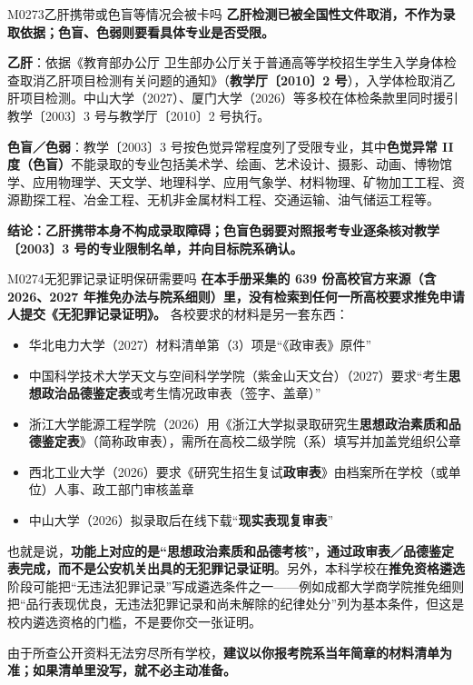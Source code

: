 \begin{qa}{M0273}{乙肝携带或色盲等情况会被卡吗}
\textbf{乙肝检测已被全国性文件取消，不作为录取依据；色盲、色弱则要看具体专业是否受限。}

\textbf{乙肝}：依据《教育部办公厅 卫生部办公厅关于普通高等学校招生学生入学身体检查取消乙肝项目检测有关问题的通知》（\textbf{教学厅〔2010〕2 号}），入学体检取消乙肝项目检测。中山大学（2027）、厦门大学（2026）等多校在体检条款里同时援引教学〔2003〕3 号与教学厅〔2010〕2 号执行。

\textbf{色盲／色弱}：教学〔2003〕3 号按色觉异常程度列了受限专业，其中\textbf{色觉异常 II 度（色盲）}不能录取的专业包括美术学、绘画、艺术设计、摄影、动画、博物馆学、应用物理学、天文学、地理科学、应用气象学、材料物理、矿物加工工程、资源勘探工程、冶金工程、无机非金属材料工程、交通运输、油气储运工程等。

\textbf{结论：乙肝携带本身不构成录取障碍；色盲色弱要对照报考专业逐条核对教学〔2003〕3 号的专业限制名单，并向目标院系确认。}
\end{qa}

\begin{qa}{M0274}{无犯罪记录证明保研需要吗}
\textbf{在本手册采集的 639 份高校官方来源（含 2026、2027 年推免办法与院系细则）里，没有检索到任何一所高校要求推免申请人提交《无犯罪记录证明》。} 各校要求的材料是另一套东西：

\begin{itemize}
  \item 华北电力大学（2027）材料清单第（3）项是“《政审表》原件”
  \item 中国科学技术大学天文与空间科学学院（紫金山天文台）（2027）要求“考生\textbf{思想政治品德鉴定表}或考生情况政审表（签字、盖章）”
  \item 浙江大学能源工程学院（2026）用《浙江大学拟录取研究生\textbf{思想政治素质和品德鉴定表}》（简称政审表），需所在高校二级学院（系）填写并加盖党组织公章
  \item 西北工业大学（2026）要求《研究生招生复试\textbf{政审表}》由档案所在学校（或单位）人事、政工部门审核盖章
  \item 中山大学（2026）拟录取后在线下载“\textbf{现实表现复审表}”
\end{itemize}

也就是说，\textbf{功能上对应的是“思想政治素质和品德考核”，通过政审表／品德鉴定表完成，而不是公安机关出具的无犯罪记录证明}。另外，本科学校在\textbf{推免资格遴选}阶段可能把“无违法犯罪记录”写成遴选条件之一——例如成都大学商学院推免细则把“品行表现优良，无违法犯罪记录和尚未解除的纪律处分”列为基本条件，但这是校内遴选资格的门槛，不是要你交一张证明。

由于所查公开资料无法穷尽所有学校，\textbf{建议以你报考院系当年简章的材料清单为准；如果清单里没写，就不必主动准备。}
\end{qa}

